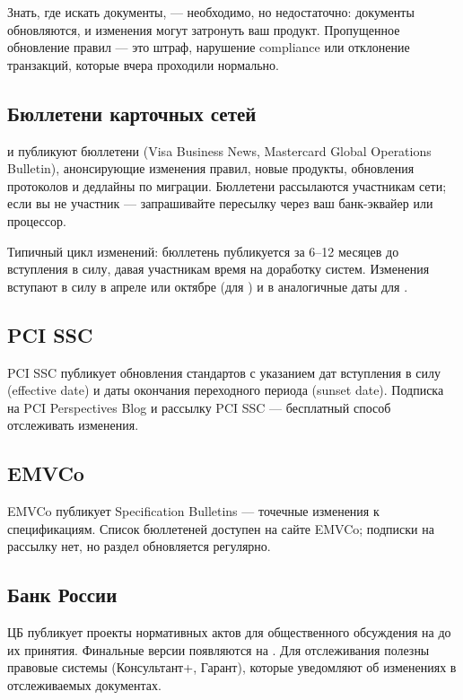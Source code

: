 Знать, где искать документы, — необходимо, но недостаточно:
документы обновляются, и изменения могут затронуть ваш продукт.
Пропущенное обновление правил — это штраф, нарушение
compliance или отклонение транзакций, которые вчера проходили
нормально.

\subsection*{Бюллетени карточных сетей}

 и  публикуют бюллетени
(Visa Business News, Mastercard Global Operations Bulletin),
анонсирующие изменения правил, новые продукты, обновления
протоколов и дедлайны по миграции. Бюллетени рассылаются
участникам сети; если вы не участник — запрашивайте
пересылку через ваш банк-эквайер или процессор.

Типичный цикл изменений: бюллетень публикуется за 6--12 месяцев
до вступления в силу, давая участникам время на доработку
систем. Изменения вступают в силу в апреле или октябре
(для ) и в аналогичные даты
для .

\subsection*{PCI SSC}

PCI SSC публикует обновления стандартов с указанием дат вступления в силу (effective date) и даты окончания переходного
периода (sunset date). Подписка на PCI Perspectives Blog и рассылку PCI SSC — бесплатный способ отслеживать изменения.

\subsection*{EMVCo}

EMVCo публикует Specification Bulletins — точечные изменения к спецификациям. Список бюллетеней доступен на сайте
EMVCo; подписки на рассылку нет, но раздел обновляется регулярно.

\subsection*{Банк России}

ЦБ публикует проекты нормативных актов для общественного
обсуждения на  до их принятия.
Финальные версии появляются на . Для отслеживания
полезны правовые системы (Консультант+, Гарант), которые
уведомляют об изменениях в отслеживаемых документах.

